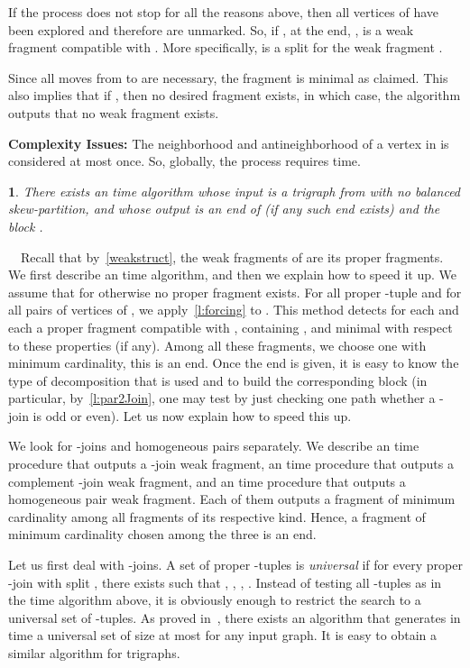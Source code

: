 \documentclass[11 pt] {article}
\newcommand\blackslug{\hbox{\hskip 1pt \vrule width 4pt height 8pt depth 1.5pt
        \hskip 1pt}}
\newcommand\bbox{\hfill \quad \blackslug \medbreak}
\newtheorem{theorem}{}[section]
\newcounter{claim}
\newcommand{\Proof}{\setcounter{claim}{0}\noindent{\bf Proof.}\ \ }
\begin{document}
If the process does not stop for all the reasons above, then all
vertices of  have been explored and therefore are unmarked.  So, if
, at the end, , is a weak fragment compatible with .
More specifically,  is a split for the
weak fragment .



Since all moves from  to  are necessary, the fragment is minimal
as claimed.  This also implies that if , then no desired
fragment exists, in which case, the algorithm outputs that no weak
fragment exists.

\noindent\textbf{Complexity Issues:} The neighborhood and
antineighborhood of a vertex in  is considered at most once.  So,
globally, the process requires  time.  \bbox


\begin{theorem}
  \label{th:detect}
  There exists an  time algorithm whose input is a trigraph
   from  with no balanced skew-partition, and whose output
  is an end  of  (if any such end exists) and the block .
\end{theorem}

\Proof Recall that by~\ref{weakstruct}, the weak fragments of  are
its proper fragments.  We first describe an  time algorithm,
and then we explain how to speed it up.  We assume that 
for otherwise no proper fragment exists.  For all proper -tuple  and for all pairs of vertices  of , we apply~\ref{l:forcing} to .  This method detects for each  and each  a
proper fragment compatible with , containing , and minimal
with respect to these properties (if any).  Among all these fragments,
we choose one with minimum cardinality, this is an end.  Once the end is
given, it is easy to know the type of decomposition that is used and
to build the corresponding block (in particular, by~\ref{l:par2Join},
one may test by just checking one path whether a -join is odd or
even).  Let us now explain how to speed this up.

We look for -joins and homogeneous pairs separately.  We describe
an  time procedure that outputs a -join weak fragment, an
 time procedure that outputs a complement -join weak
fragment, and an  time procedure that outputs a homogeneous
pair weak fragment.  Each of them outputs a fragment of minimum
cardinality among all fragments of its respective kind.  Hence, a
fragment of minimum cardinality chosen among the three is an end.

Let us first deal with -joins.  A set  of proper -tuples
is \emph{universal} if for every proper -join with split , there exists  such that , , , .  Instead of testing all -tuples as in the  time
algorithm above, it is obviously enough to restrict the search to a
universal set of -tuples.  As proved in~\cite{ChHaTrVu:2-join},
there exists an algorithm that generates in time  a universal
set of size at most  for any input graph.  It is easy to
obtain a similar algorithm for trigraphs.
\end{document}
